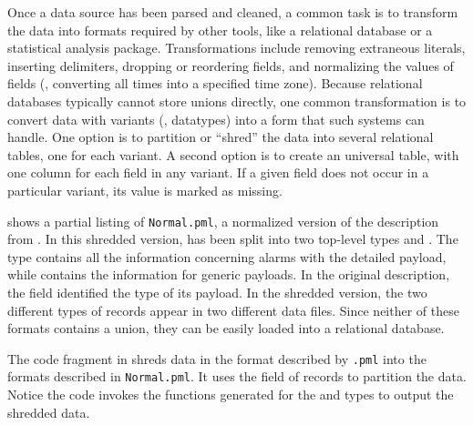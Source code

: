 Once a data source has been parsed and cleaned, a common task is to
transform the data into formats required by other tools, like a
relational database or a statistical analysis package.
Transformations include removing extraneous literals, inserting
delimiters, dropping or reordering fields, and normalizing the values
of fields (\eg{}, converting all times into a specified time zone).
Because relational databases typically cannot store unions directly,
one common transformation is to convert data with variants (\ie{},
datatypes) into a form that such systems can handle.  One option is to
partition or ``shred'' the data into several relational tables, one
for each variant.  A second option is to create an universal table,
with one column for each field in any variant.  If a given field does
not occur in a particular variant, its value is marked as missing.

 shows a partial listing of
\texttt{\darkstar{}Normal.pml}, a normalized version of the
\darkstar{} description from . In this
shredded version,  has been split into two top-level types
 and .  The type  contains all
the information concerning alarms with the detailed payload, while
 contains the information for generic payloads.  In the
original description, the  field identified the type of its
payload.  In the shredded version, the two different types of records
appear in two different data files. Since neither of these formats
contains a union, they can be easily loaded into a relational
database.

The code fragment in  shreds \darkstar{}
data in the format described by \texttt{\darkstar{}.pml} into the
formats described in \texttt{\darkstar{}Normal.pml}.  It uses the
 field of  records to partition the data. 
Notice the code invokes the  functions generated for the  and  types to output the shredded data.

